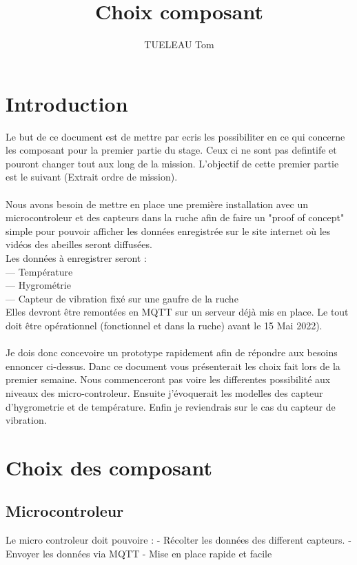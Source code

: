 \documentclass[5pt]{article}
\title{Choix composant}
\author{TUELEAU Tom}
\begin{document}
\maketitle

\section{Introduction}

Le but de ce document est de mettre par ecris les possibiliter en ce qui concerne les composant pour la premier partie du stage. Ceux ci ne sont pas defintife et pouront changer tout aux long de la mission. L'objectif de cette premier partie est le suivant (Extrait ordre de mission).\\ 
\\
Nous avons besoin de mettre en place une première installation avec un microcontroleur et
des capteurs dans la ruche afin de faire un "proof of concept" simple pour pouvoir afficher les
données enregistrée sur le site internet où les vidéos des abeilles seront diffusées.\\
Les données à enregistrer seront :\\
— Température\\
— Hygrométrie\\
— Capteur de vibration fixé sur une gaufre de la ruche\\
Elles devront être remontées en MQTT sur un serveur déjà mis en place.
Le tout doit être opérationnel (fonctionnel et dans la ruche) avant le 15 Mai 2022).
\\
\\
Je dois donc concevoire un prototype rapidement afin de répondre aux besoins ennoncer ci-dessus.
Danc ce document vous présenterait les choix fait lors de la premier semaine. Nous commenceront pas voire les differentes possibilité aux niveaux des micro-controleur. Ensuite j'évoquerait les modelles des capteur d'hygrometrie et de température. Enfin je reviendrais sur le cas du capteur de vibration.

\newpage{}
\section{Choix des composant}

\subsection{Microcontroleur}
Le micro controleur doit pouvoire :
	- Récolter les données des different capteurs.
	- Envoyer les données via MQTT
	- Mise en place rapide et facile
\end{document}
